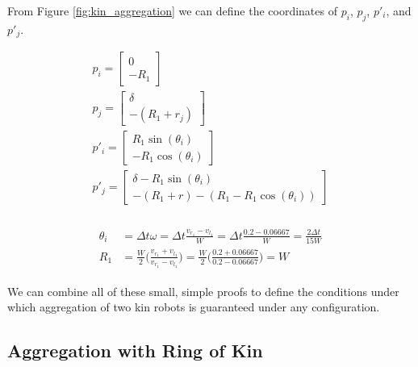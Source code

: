 \documentclass[conference]{IEEEtran}
\begin{document}
    From Figure \ref{fig:kin_aggregation} we can define the coordinates of $p_i$, $p_j$, $p'_i$, and $p'_j$.

    \begin{equation} \label{eq:two_kin_vars_1}
      \begin{split}
        p_i = \begin{bmatrix}0 \\ -R_1\end{bmatrix} \\
        p_j = \begin{bmatrix}\delta \\ -(R_1+r_j)\end{bmatrix} \\
        p'_i = \begin{bmatrix}R_1\sin(\theta_i) \\ -R_1\cos(\theta_i)\end{bmatrix} \\
        p'_j = \begin{bmatrix}\delta - R_1\sin(\theta_i) \\ -(R_1+r) - (R_1-R_1\cos(\theta_i))\end{bmatrix} \\
      \end{split}
    \end{equation}

    \begin{align}
      \begin{split} \label{eq:theta_and_r}
        \theta_i &= \Delta t\omega = \Delta t \frac{v_{r_1} - v_{l_1}}{W} = \Delta t \frac{0.2 - 0.06667}{W} = \frac{2\Delta t}{15W} \\
        R_1 &= \frac{W}{2}\bigg(\frac{v_{r_1} + v_{l_1}}{v_{r_1} - v_{l_1}}\bigg) = \frac{W}{2}\bigg(\frac{0.2 + 0.06667}{0.2 - 0.06667}\bigg) = W
      \end{split}
    \end{align}

      We can combine all of these small, simple proofs to define the conditions under which aggregation of two kin robots is guaranteed under any configuration.


  \subsection{Aggregation with Ring of Kin}
\end{document}
